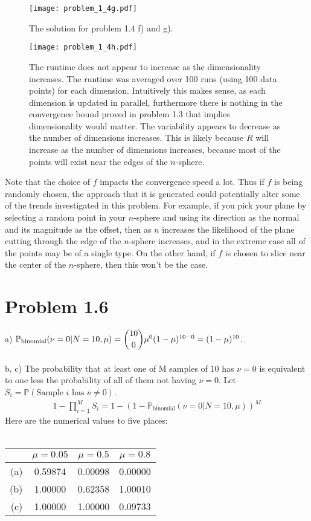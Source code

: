 \documentclass[11pt,letterpaper]{article}
\newcommand{\p}[0]{\mathbb{P}}
\begin{document}
\begin{figure}
	\centering
    \texttt{[image: problem\_1\_4g.pdf]}
	\caption{The solution for problem 1.4 f) and g).  }
\end{figure}


\begin{figure}
	\centering
    \texttt{[image: problem\_1\_4h.pdf]}
	\caption{The runtime does not appear to increase as the dimensionality increases.  The runtime was averaged over 100 runs (using 100 data points) for each dimension.  Intuitively this makes sense, as each dimension is updated in parallel, furthermore there is nothing in the convergence bound proved in problem 1.3 that implies dimensionality would matter.  The variability appears to decrease as the number of dimensions increases.  This is likely because $R$ will increase as the number of dimensions increases, because most of the points will exist near the edges of the $n$-sphere.}
\end{figure}

Note that the choice of $f$ impacts the convergence speed a lot.  Thus if $f$ is being randomly chosen, the approach that it is generated could potentially alter some of the trends investigated in this problem.  For example, if you pick your plane by selecting a random point in your $n$-sphere and using its direction as the normal and its magnitude as the offset, then as $n$ increases the likelihood of the plane cutting through the edge of the $n$-sphere increases, and in the extreme case all of the points may be of a single type.  On the other hand, if $f$ is chosen to slice near the center of the $n$-sphere, then this won't be the case.


\section*{Problem 1.6}

a) $\p_\textrm{binomial}(\nu = 0 | N = 10, \mu) = \dbinom{10}{0} \mu^0 (1 - \mu)^{10 - 0} = (1 - \mu)^{10}$.
\\\\
b, c) The probability that at least one of M samples of 10 has $\nu = 0$ is equivalent to one less the probability of all of them not having $\nu = 0$.  Let $S_i = \p(\textrm{Sample $i$ has $\nu \ne 0$})$.
\begin{align*}
    1 - \prod_{i = 1}^{M} S_i = 1 - (1 - \p_\textrm{binomial}(\nu = 0 | N = 10, \mu))^M
\end{align*}
Here are the numerical values to five places:
\\\\
\centering
\begin{tabular}{|r|c|c|c|}
    \hline
    & $\mu = 0.05$ & $\mu = 0.5$ & $\mu = 0.8$ 
    \\ \hline
    (a) & 0.59874 & 0.00098 & 0.00000 
    \\ \hline
    (b) & 1.00000 & 0.62358 & 1.00010 
    \\ \hline
    (c) & 1.00000 & 1.00000 & 0.09733 
    \\ \hline
\end{tabular}
\end{document}
